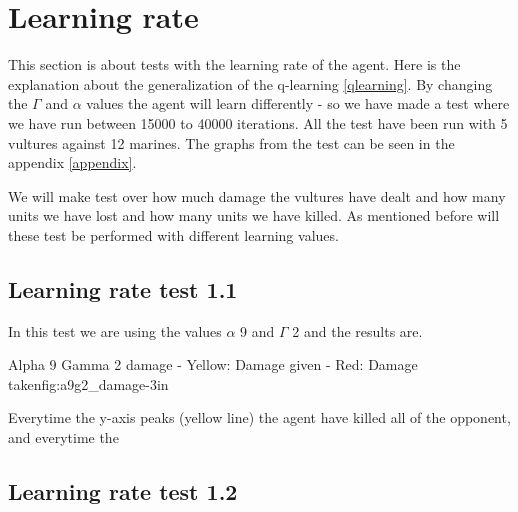 \section{Learning rate}
This section is about tests with the learning rate of the agent. Here is the explanation about the generalization of the q-learning \ref{qlearning}.
By changing the $\Gamma$ and $\alpha$ values the agent will learn differently - so we have made a test where we have run between 15000 to 40000 iterations. All the test have been run with 5 vultures against 12 marines. The graphs from the test can be seen in the appendix \ref{appendix}.

We will make test over how much damage the vultures have dealt and how many units we have lost and how many units we have killed. As mentioned before will these test be performed with different learning values. 

\subsection*{Learning rate test 1.1}
In this test we are using the values $\alpha$ 9 and $\Gamma$ 2 and the results are.

			{Alpha 9 Gamma 2 damage - Yellow: Damage given - Red: Damage taken}{fig:a9g2_damage}{-3in}

Everytime the y-axis peaks (yellow line) the agent have killed all of the opponent, and everytime the 





\subsection*{Learning rate test 1.2}


%
%
%
